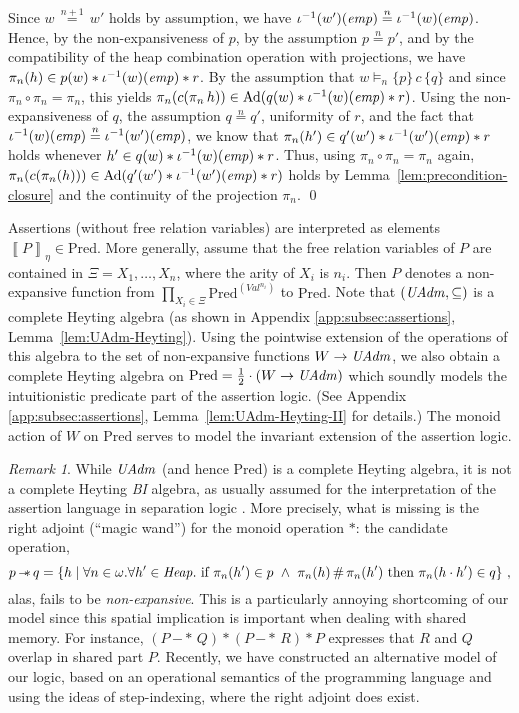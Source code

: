 \documentclass{LMCS}
\theoremstyle{remark}
\newtheorem{remark}[theorem]{Remark}
\newcommand{\Val}{\ensuremath{\mathit{Val}}\xspace}
\newcommand{\COMB}{\ensuremath{\cdot}}
\newcommand{\DISJ}{\ensuremath{\mathop{\#}}}
\newcommand{\triple}[3]{{\ensuremath{\!\left.\{ #1 \}\, #2\, \{  #3 \}\!\right.}}}
\newcommand{\wemp}{\textnormal{\textit{emp}}}
\newcommand{\den}[1]{\left\llbracket #1
  \right\rrbracket}
\newcommand{\mimp}{\,{-\!\!*}\,}
\newcommand{\Pred}{\ensuremath{\mathrm{Pred}}\xspace}
\newcommand{\W}{\ensuremath{W}}
\newcommand{\UNFOLD}{\ensuremath{\iota^{-1}}}
\newcommand{\nequiv}[1]{\ensuremath{\mathrel{\stackrel{#1}{=}}}}
\newcommand{\X}{\ensuremath{\Xi}}
\begin{document}
Since $w\,{\nequiv{n{+}1}}\,w'$ holds by assumption, we have $\UNFOLD(w')(\wemp)\nequiv{n }\UNFOLD(w)(\wemp)$.  
Hence, by the non-expansiveness of $p$, by the assumption $p\nequiv n p'$, and by the compatibility of the heap combination operation with projections, we have 
$\pi_{n }(h)\in p(w) * \UNFOLD(w)(\wemp) *r$. 
By the assumption that $w\models_n\triple pcq$ and since $\pi_n\circ\pi_n=\pi_n$, this yields 
$\pi_n(c(\pi_{n}\,h))\in \DCl(q(w) * \UNFOLD(w)(\wemp) *r)$. 
Using the non-expansiveness of $q$, the assumption $q\nequiv n q'$,  uniformity of $r$, and the fact that $\UNFOLD(w)(\wemp)\nequiv{n }\UNFOLD(w')(\wemp)$, we know that  
$\pi_{n }(h')\in q'(w') * \UNFOLD(w')(\wemp) *r$ holds whenever $h'\in q(w) * \UNFOLD(w)(\wemp) *r$. 
Thus, using $\pi_n\circ\pi_n=\pi_n$ again, $\pi_{n }(c(\pi_{n }(h)))\in \DCl(q'(w') * \UNFOLD(w')(\wemp) *r)$ holds by Lemma~\ref{lem:precondition-closure} and the  continuity of the projection $\pi_{n }$. \qed 


Assertions (without free relation variables) are interpreted as elements  
$\den{P}_\eta\in\Pred$. 
More generally,  assume that the free relation variables of $P$ are contained in $\X = X_1,\ldots,X_n$, where the arity of $X_i$ is $n_i$. 
Then $P$ denotes  a non-expansive function from $\prod_{X_i\in\X}\Pred^{(\Val^{n_i})}$ to $\Pred$. 
Note that $(\mathit{UAdm},\subseteq)$ is a complete Heyting algebra (as shown in Appendix \ref{app:subsec:assertions}, 
Lemma~\ref{lem:UAdm-Heyting}). Using the pointwise extension of the operations of this algebra to the set of non-expansive functions 
$\W\to\UAdm$, we also obtain a complete Heyting  algebra on $\Pred = \frac 1 2\cdot(\W\to\UAdm)$ which soundly models the intuitionistic 
predicate  part of the assertion logic. (See Appendix \ref{app:subsec:assertions}, Lemma~\ref{lem:UAdm-Heyting-II} for details.)  
The monoid action of $\W$ on $\Pred$ serves to model the invariant extension of the assertion logic. 

\begin{remark}\label{remark:wand}
While $\mathit{UAdm}$ (and hence $\Pred$) is a complete Heyting algebra, it is not a complete Heyting \emph{BI} algebra, as usually assumed for the interpretation of the assertion language in separation logic \cite{Pym:OHearn:Yang:04}. 
More precisely, what is missing is the right adjoint (``magic wand'') for the monoid operation $*$: the candidate operation, 
\[
p\mimp q = \{h\;|\;\forall n\in\omega.\forall h'\in \Heap.\ \text{if $\pi_n(h')\in p\ \wedge\ \pi_n(h)\DISJ \pi_n(h')$ then $\pi_n(h\COMB h')\in q$}\}\ ,
\] 
alas,  fails to be \emph{non-expansive}. This is a particularly annoying shortcoming of our model since this spatial implication is important when dealing with shared memory. For instance, $(P\mimp Q) * (P\mimp R) * P$ expresses that $R$ and $Q$ overlap in shared part  $P$. 
 Recently, we have constructed an alternative model of our logic, based on an operational semantics of the programming language and using the ideas of step-indexing, where the right adjoint does exist. 
 \end{remark}
\end{document}
